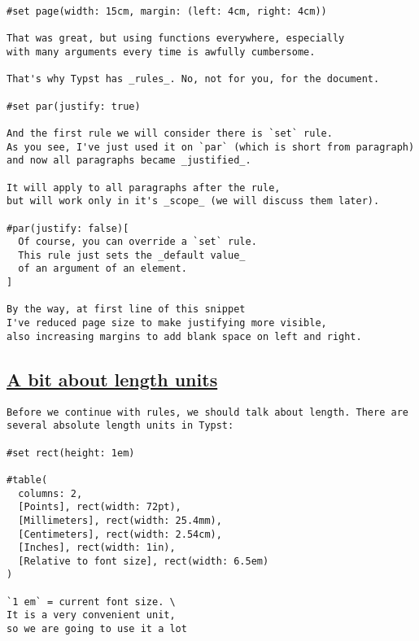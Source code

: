 \begin{verbatim}
#set page(width: 15cm, margin: (left: 4cm, right: 4cm))

That was great, but using functions everywhere, especially
with many arguments every time is awfully cumbersome.

That's why Typst has _rules_. No, not for you, for the document.

#set par(justify: true)

And the first rule we will consider there is `set` rule.
As you see, I've just used it on `par` (which is short from paragraph)
and now all paragraphs became _justified_.

It will apply to all paragraphs after the rule,
but will work only in it's _scope_ (we will discuss them later).

#par(justify: false)[
  Of course, you can override a `set` rule.
  This rule just sets the _default value_
  of an argument of an element.
]

By the way, at first line of this snippet
I've reduced page size to make justifying more visible,
also increasing margins to add blank space on left and right.
\end{verbatim}

\pandocbounded{}

\subsection{\texorpdfstring{\hyperref[a-bit-about-length-units]{A bit
about length
units}}{A bit about length units}}\label{a-bit-about-length-units}

\begin{verbatim}
Before we continue with rules, we should talk about length. There are several absolute length units in Typst:

#set rect(height: 1em)

#table(
  columns: 2,
  [Points], rect(width: 72pt),
  [Millimeters], rect(width: 25.4mm),
  [Centimeters], rect(width: 2.54cm),
  [Inches], rect(width: 1in),
  [Relative to font size], rect(width: 6.5em)
)

`1 em` = current font size. \
It is a very convenient unit,
so we are going to use it a lot
\end{verbatim}

\pandocbounded{}

